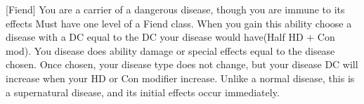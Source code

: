  {[Fiend]}
\shortdescfeat
{You are a carrier of a dangerous disease, though you are immune to its effects}
{Must have one level of a Fiend class.}
{When you gain this ability choose a disease with a DC equal to the DC your disease would have(Half HD + Con mod). You disease does ability damage or special effects equal to the disease chosen. Once chosen, your disease type does not change, but your disease DC will increase when your HD or Con modifier increase. Unlike a normal disease, this is a supernatural disease, and its initial effects occur immediately.}